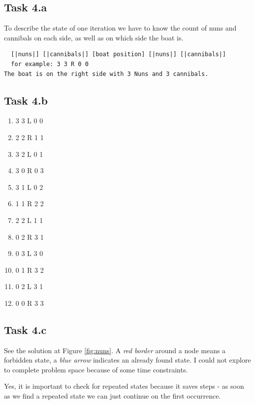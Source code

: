 \documentclass{article}
\begin{document}
\subsection*{Task 4.a}
To describe the state of one iteration we have to know the count of nuns and cannibals on each side, 
as well as on which side the boat is.
\begin{verbatim}
  [|nuns|] [|cannibals|] [boat position] [|nuns|] [|cannibals|]
  for example: 3 3 R 0 0 
The boat is on the right side with 3 Nuns and 3 cannibals.
\end{verbatim}

\subsection*{Task 4.b}
\begin{enumerate}    
    \item 3 3 L 0 0
    \item 2 2 R 1 1
    \item 3 2 L 0 1
    \item 3 0 R 0 3
    \item 3 1 L 0 2
    \item 1 1 R 2 2
    \item 2 2 L 1 1
    \item 0 2 R 3 1
    \item 0 3 L 3 0
    \item 0 1 R 3 2
    \item 0 2 L 3 1
    \item 0 0 R 3 3
  \end{enumerate}

\subsection*{Task 4.c}
See the solution at Figure \ref{fig:nuns}. A \emph{red border} around a node means a forbidden state, 
a \emph{blue arrow} indicates an already found state. I could not explore to complete problem space because of some time constraints. 


Yes, it is important to check for repeated states because it saves steps - as soon as we find a repeated state we can just continue on 
the first occurrence.
\end{document}
